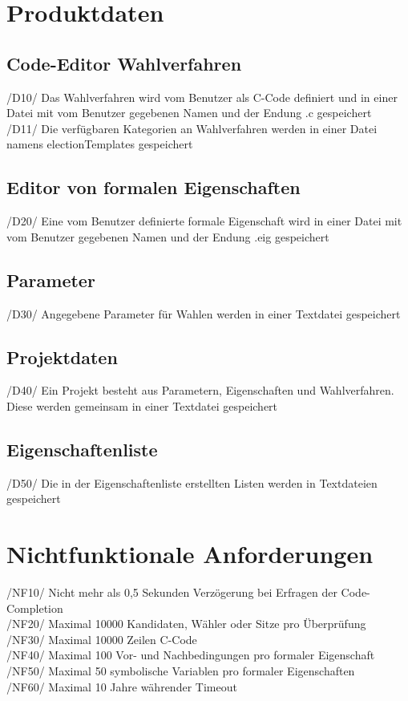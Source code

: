 \documentclass[a4paper]{scrreprt}
\begin{document}
\chapter{Produktdaten}
\section{Code-Editor Wahlverfahren}
/D10/ Das Wahlverfahren wird vom \gls{Benutzer} als C-Code definiert und in einer Datei mit vom \gls{Benutzer} gegebenen Namen und der Endung .c gespeichert \\
/D11/ Die verfügbaren Kategorien an Wahlverfahren werden in einer Datei namens electionTemplates gespeichert\\

\section{Editor von formalen Eigenschaften}
/D20/ Eine vom \gls{Benutzer} definierte formale Eigenschaft wird in einer Datei mit vom \gls{Benutzer} gegebenen Namen und der Endung .eig gespeichert \\

\section{Parameter}
/D30/ Angegebene Parameter für Wahlen werden in einer Textdatei gespeichert \\


\section{Projektdaten}
/D40/ Ein Projekt besteht aus Parametern, Eigenschaften und Wahlverfahren. Diese werden gemeinsam in einer Textdatei gespeichert \\

\section{Eigenschaftenliste}
/D50/ Die in der Eigenschaftenliste erstellten Listen werden in Textdateien gespeichert \\

\chapter{Nichtfunktionale Anforderungen}
/NF10/ Nicht mehr als 0,5 Sekunden Verzögerung bei Erfragen der Code-Completion \\
/NF20/ Maximal 10000 Kandidaten, Wähler oder Sitze pro Überprüfung \\
/NF30/ Maximal 10000 Zeilen C-Code \\
/NF40/ Maximal 100 Vor- und Nachbedingungen pro formaler Eigenschaft \\
/NF50/ Maximal 50 symbolische Variablen pro formaler Eigenschaften \\
/NF60/ Maximal 10 Jahre währender Timeout \\
\end{document}
